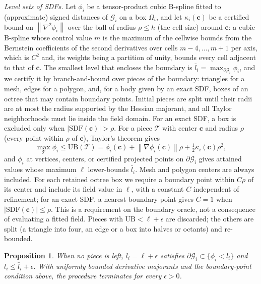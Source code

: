 \documentclass[journal]{IEEEtran}
\newtheorem{proposition}{Proposition}
\theoremstyle{definition}
\newcommand{\norm}[1]{\left\lVert #1\right\rVert}
\begin{document}
\emph{Level sets of SDFs.} Let $\phi_i$ be a tensor-product cubic B-spline fitted to (approximate)
signed distances of $\mathcal G_i$ on a box $\Omega_i$, and let $\kappa_i(\mathbf c)$ be a certified
bound on $\norm{\nabla^2\phi_i}$ over the ball of radius $\rho\le h$ (the cell size) around $\mathbf c$: a
cubic B-spline whose control value $m$ is the maximum of the cellwise bounds from the Bernstein
coefficients of the second derivatives over cells $m-4,\dots,m+1$ per axis, which is $C^2$ and, its
weights being a partition of unity, bounds every cell adjacent to that of $\mathbf c$. The smallest level that encloses the boundary is
$\bar l_i=\max_{\partial\mathcal G_i}\phi_i$, and we certify it by branch-and-bound over pieces of the
boundary: triangles for a mesh, edges for a polygon, and, for a body given by an exact SDF, boxes of an
octree that may contain boundary points. Initial pieces are split until their radii are at most
the radius supported by the Hessian majorant, and all Taylor neighborhoods must lie inside the
field domain. For an exact SDF, a box is excluded only when
$|\mathrm{SDF}(\mathbf c)|>\rho$. For a piece $\mathcal T$ with center $\mathbf c$ and radius
$\rho$ (every point within $\rho$ of $\mathbf c$), Taylor's theorem gives
\begin{equation}\label{eq:level-ub}
\max_{\mathcal T}\phi_i\le\mathrm{UB}(\mathcal T)=\phi_i(\mathbf c)+\norm{\nabla\phi_i(\mathbf c)}\rho
+\tfrac12\kappa_i(\mathbf c)\rho^2 ,
\end{equation}
and $\phi_i$ at vertices, centers, or certified projected points on $\partial\mathcal G_i$ gives
attained values whose maximum $\ell$ lower-bounds $\bar l_i$. Mesh and polygon centers are always
included. For each retained octree box we
require a boundary point within $C\rho$ of its center and include its field value in $\ell$,
with a constant $C$ independent of refinement; for an exact SDF, a nearest boundary point gives $C=1$ when
$|\mathrm{SDF}(\mathbf c)|\le\rho$. This is a requirement on the boundary oracle, not a
consequence of evaluating a fitted field. Pieces with $\mathrm{UB}<\ell+\epsilon$ are discarded;
the others are split (a triangle into four, an edge or a box into halves or octants) and re-bounded.
\begin{proposition}\label{prop:level}
When no piece is left, $l_i=\ell+\epsilon$ satisfies $\partial\mathcal G_i\subset\{\phi_i<l_i\}$ and
$l_i\le\bar l_i+\epsilon$. With uniformly bounded derivative majorants and the boundary-point
condition above, the procedure terminates for every $\epsilon>0$.
\end{proposition}
\end{document}
